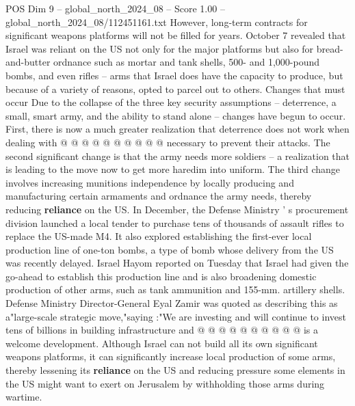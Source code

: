 \begin{textsample}{POS Dim 9 – global\_north\_2024\_08 – Score 1.00 – global\_north\_2024\_08/112451161.txt}
However, long-term contracts for significant weapons platforms will not be filled for years.
October 7 revealed that Israel was reliant on the US not only for the major platforms but also for bread-and-butter ordnance such as mortar and tank shells, 500- and 1,000-pound bombs, and even rifles -- arms that Israel does have the capacity to produce, but because of a variety of reasons, opted to parcel out to others.
Changes that must occur Due to the collapse of the three key security assumptions -- deterrence, a small, smart army, and the ability to stand alone -- changes have begun to occur.
First, there is now a much greater realization that deterrence does not work when dealing with @ @ @ @ @ @ @ @ @ @ necessary to prevent their attacks.
The second significant change is that the army needs more soldiers -- a realization that is leading to the move now to get more haredim into uniform.
The third change involves increasing munitions independence by locally producing and manufacturing certain armaments and ordnance the army needs, thereby reducing \textbf{reliance} on the US.
In December, the Defense Ministry ' s procurement division launched a local tender to purchase tens of thousands of assault rifles to replace the US-made M4.
It also explored establishing the first-ever local production line of one-ton bombs, a type of bomb whose delivery from the US was recently delayed.
Israel Hayom reported on Tuesday that Israel had given the go-ahead to establish this production line and is also broadening domestic production of other arms, such as tank ammunition and 155-mm. artillery shells.
Defense Ministry Director-General Eyal Zamir was quoted as describing this as a"large-scale strategic move,"saying :"We are investing and will continue to invest tens of billions in building infrastructure and @ @ @ @ @ @ @ @ @ @ is a welcome development.
Although Israel can not build all its own significant weapons platforms, it can significantly increase local production of some arms, thereby lessening its \textbf{reliance} on the US and reducing pressure some elements in the US might want to exert on Jerusalem by withholding those arms during wartime.

\end{textsample}
